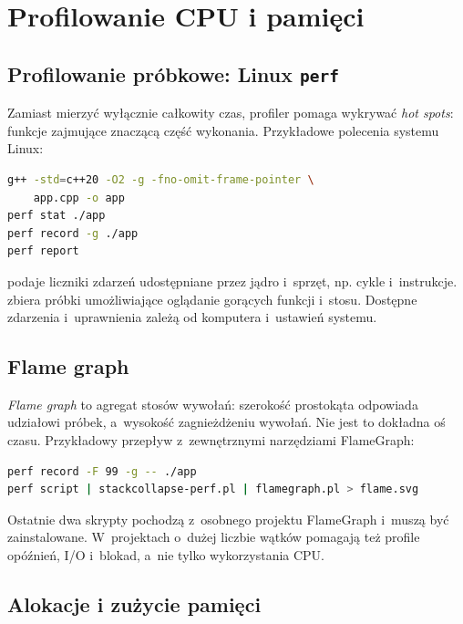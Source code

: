 \section{Profilowanie CPU i pamięci}
\label{sec:cpp18-profiling}

\subsection{Profilowanie próbkowe: Linux \texttt{perf}}

Zamiast mierzyć wyłącznie całkowity czas, profiler pomaga wykrywać
\emph{hot spots}: funkcje zajmujące znaczącą część wykonania.
Przykładowe polecenia systemu Linux:

\begin{lstlisting}[language=bash,caption={Profilowanie CPU przez perf (Linux).}]
g++ -std=c++20 -O2 -g -fno-omit-frame-pointer \
    app.cpp -o app
perf stat ./app
perf record -g ./app
perf report
\end{lstlisting}

 podaje liczniki zdarzeń udostępniane przez jądro
i~sprzęt, np. cykle i~instrukcje. \code{perf record} zbiera próbki
umożliwiające oglądanie gorących funkcji i~stosu. Dostępne zdarzenia
i~uprawnienia zależą od komputera i~ustawień systemu.

\subsection{Flame graph}

\emph{Flame graph} to agregat stosów wywołań: szerokość prostokąta
odpowiada udziałowi próbek, a~wysokość zagnieżdżeniu wywołań.
Nie jest to dokładna oś czasu. Przykładowy przepływ z~zewnętrznymi
narzędziami FlameGraph:

\begin{lstlisting}[language=bash,caption={Tworzenie flame graph z probek perf (Linux).}]
perf record -F 99 -g -- ./app
perf script | stackcollapse-perf.pl | flamegraph.pl > flame.svg
\end{lstlisting}

Ostatnie dwa skrypty pochodzą z~osobnego projektu FlameGraph i~muszą
być zainstalowane. W~projektach o~dużej liczbie wątków pomagają też
profile opóźnień, I/O i~blokad, a~nie tylko wykorzystania CPU.

\subsection{Alokacje i zużycie pamięci}

